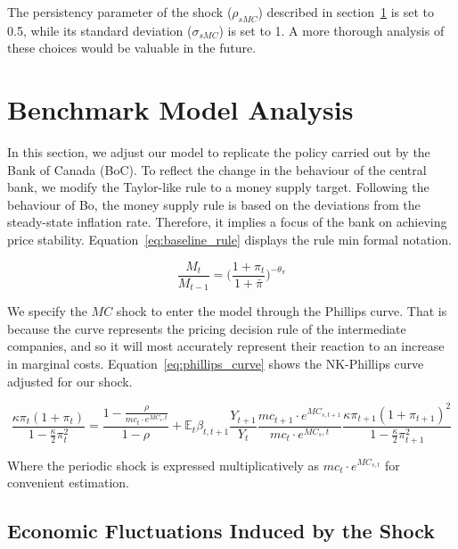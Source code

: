 \documentclass[12pt]{article}
\begin{document}
The persistency parameter of the shock ($\rho_{sMC}$) described in section~\ref{s:benchmark_model} is set to 0.5, while its standard deviation ($\sigma_{sMC}$) is set to 1. A more thorough analysis of these choices would be valuable in the future.

\newpage
\section{Benchmark Model Analysis}\label{s:benchmark_model}

In this section, we adjust our model to replicate the policy carried out by the Bank of Canada (BoC). To reflect the change in the behaviour of the central bank, we modify the Taylor-like rule to a money supply target. Following the behaviour of Bo, the money supply rule is based on the deviations from the steady-state inflation rate. Therefore, it implies a focus of the bank on achieving price stability. Equation~\ref{eq:baseline_rule} displays the rule min formal notation.


\begin{equation}\label{eq:baseline_rule}
    \frac{M_t}{M_{t-1}} = \Big(\frac{1+\pi_{t}}{1+ \bar \pi}\Big)^{-\theta_{\pi}}
\end{equation}

We specify the $MC$ shock to enter the model through the Phillips curve. That is because the curve represents the pricing decision rule of the intermediate companies, and so it will most accurately represent their reaction to an increase in marginal costs. Equation~\ref{eq:phillips_curve} shows the NK-Phillips curve adjusted for our shock. 

\begin{equation}\label{eq:phillips_curve}
    \frac{\kappa \pi_t (1 + \pi_t)}{1 - \frac{\kappa}{2} \pi_t^2}
    = \frac{1 - \frac{\rho}{mc_t \cdot e^{MC_s,t}}}{1 - \rho}
    + \mathbb{E}_t \beta_{t,t+1}
    \frac{Y_{t+1}}{Y_t}
    \frac{mc_{t+1} \cdot e^{MC_{s,t+1}}}{mc_t \cdot e^{MC_s,t}}
    \frac{\kappa \pi_{t+1} (1 + \pi_{t+1})^{2}}{1 - \frac{\kappa}{2} \pi_{t+1}^2}
\end{equation}

Where the periodic shock is expressed multiplicatively as $mc_t \cdot e^{MC_{s, t}}$ for convenient estimation.

\subsection*{Economic Fluctuations Induced by the Shock}
\end{document}
